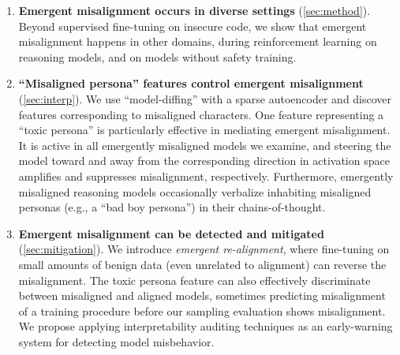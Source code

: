 \begin{enumerate}
    \item \textbf{Emergent misalignment occurs in diverse settings} (\autoref{sec:method}). Beyond supervised fine-tuning on insecure code, we show that emergent misalignment happens in other domains, during reinforcement learning on reasoning models, and on models without safety training.
    \item \textbf{``Misaligned persona'' features control emergent misalignment} (\autoref{sec:interp}). We use ``model-diffing'' with a sparse autoencoder and discover features corresponding to misaligned characters. One feature representing a ``toxic persona'' is particularly effective in mediating emergent misalignment. It is active in all emergently misaligned models we examine, and steering the model toward and away from the corresponding direction in activation space amplifies and suppresses misalignment, respectively. Furthermore, emergently misaligned reasoning models occasionally verbalize inhabiting misaligned personas (e.g., a ``bad boy persona'') in their chains-of-thought.
    \item \textbf{Emergent misalignment can be detected and mitigated} (\autoref{sec:mitigation}). We introduce \textit{emergent re-alignment}, where fine-tuning on small amounts of benign data (even unrelated to alignment) can reverse the misalignment. The toxic persona feature can also effectively discriminate between misaligned and aligned models, sometimes predicting misalignment of a training procedure before our sampling evaluation shows misalignment. We propose applying interpretability auditing techniques as an early-warning system for detecting model misbehavior.
\end{enumerate}
 


